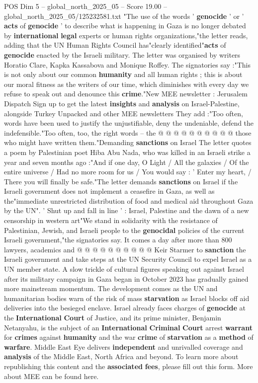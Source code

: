 \begin{textsample}{POS Dim 5 – global\_north\_2025\_05 – Score 19.00 – global\_north\_2025\_05/125232581.txt}  \label{ex:f5_pos_075}
"The use of the words ' \textbf{genocide} ' or ' \textbf{acts} of \textbf{genocide} ' to describe what is happening in Gaza is no longer debated by \textbf{international} \textbf{legal} experts or human rights organizations,"the letter reads, adding that the UN Human Rights Council has"clearly identified"\textbf{acts} of \textbf{genocide} enacted by the Israeli military.
The letter was organised by writers Horatio Clare, Kapka Kassabova and Monique Roffey.
The signatories say :"This is not only about our common \textbf{humanity} and all human rights ; this is about our moral fitness as the writers of our time, which diminishes with every day we refuse to speak out and denounce this \textbf{crime}."New MEE newsletter : Jerusalem Dispatch Sign up to get the latest \textbf{insights} and \textbf{analysis} on Israel-Palestine, alongside Turkey Unpacked and other MEE newsletters They add :"Too often, words have been used to justify the unjustifiable, deny the undeniable, defend the indefensible."Too often, too, the right words -- the @ @ @ @ @ @ @ @ @ @ those who might have written them."Demanding \textbf{sanctions} on Israel The letter quotes a poem by Palestinian poet Hiba Abu Nada, who was killed in an Israeli strike a year and seven months ago :"And if one day, O Light / All the galaxies / Of the entire universe / Had no more room for us / You would say : ' Enter my heart, / There you will finally be safe."The letter demands \textbf{sanctions} on Israel if the Israeli government does not implement a ceasefire in Gaza, as well as the"immediate unrestricted distribution of food and medical aid throughout Gaza by the UN". ' Shut up and fall in line ' : Israel, Palestine and the dawn of a new censorship in western art"We stand in solidarity with the resistance of Palestinian, Jewish, and Israeli people to the \textbf{genocidal} policies of the current Israeli government,"the signatories say.
It comes a day after more than 800 lawyers, academics and @ @ @ @ @ @ @ @ @ @ Keir Starmer to \textbf{sanction} the Israeli government and take steps at the UN Security Council to expel Israel as a UN member state.
A slow trickle of cultural figures speaking out against Israel after its military campaign in Gaza began in October 2023 has gradually gained more mainstream momentum.
The development comes as the UN and humanitarian bodies warn of the risk of mass \textbf{starvation} as Israel blocks off aid deliveries into the besieged enclave.
Israel already faces charges of \textbf{genocide} at the \textbf{International} \textbf{Court} of Justice, and its prime minister, Benjamin Netanyahu, is the subject of an \textbf{International} \textbf{Criminal} \textbf{Court} arrest \textbf{warrant} for \textbf{crimes} against \textbf{humanity} and the war \textbf{crime} of \textbf{starvation} as a \textbf{method} of \textbf{warfare}.
Middle East Eye delivers \textbf{independent} and unrivalled coverage and \textbf{analysis} of the Middle East, North Africa and beyond.
To learn more about republishing this content and the \textbf{associated} \textbf{fees}, please fill out this form.
More about MEE can be found here.


\end{textsample}
